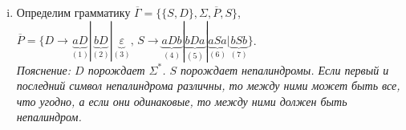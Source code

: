 \documentclass[a4paper]{article}
\begin{document}
{\begin{enumerate}[i.]
\begin{enumerate}
\begin{enumerate}[0.]
\item $n\mod 2=1\Rightarrow w=x\sigma y,\, |x|=|y|,\,\sigma\in\Sigma$. $w=w^R\Rightarrow x\sigma y=y^R\sigma^Rx^R=y^R\sigma x^R$. Так как $|x|=|y|$, $y=x^R\Rightarrow\boxed{w=x\sigma x^R}$
\end{enumerate}
Значит, $L=\{xx^R,\,xax^R,\,xbx^R\big| x\in\Sigma^*\}$.
\\[5pt]
Построим вывод $S\Longrightarrow^*xSx^R$:\begin{enumerate}[a.]
\item Пусть $x=\varepsilon$. $S\overset{(1)}{\Longrightarrow}\varepsilon=\varepsilon\varepsilon^R=w\Rightarrow w\in L(\Gamma)\,\blacksquare$. 
\item Иначе $x=x_1...x_m,\,\forall i\in\overline{1,m}\hookrightarrow x_i\in\Sigma$. Рассмотрим символы $x_m,...,x_1$. Применим правило $(2)$, если $x_i=a$ и $(3)$ иначе. Примененное правило обозначим за $R(i)$ Получим $S\overset{(R(m))}{\Longrightarrow}x_mSx_m\Longrightarrow...\overset{(R(1))}{\Longrightarrow}x_1...x_mSx_m...x_1$.
\end{enumerate}
Теперь покажем, как получить $w$:\begin{enumerate}[1.]
\item $w=xx^R$. Было получено $S\Longrightarrow^*xSx^R$. Тогда $S\Longrightarrow^*xSx^R\overset{(1)}{\Longrightarrow}xx^R\,\blacksquare$
\item $w=xax^R$. Было получено $S\Longrightarrow^*xSx^R$. Тогда $S\Longrightarrow^*xSx^R\overset{(4)}{\Longrightarrow}xax^R\,\blacksquare$
\item $w=xbx^R$. Было получено $S\Longrightarrow^*xSx^R$. Тогда $S\Longrightarrow^*xSx^R\overset{(5)}{\Longrightarrow}xbx^R\,\blacksquare$
\end{enumerate}
Получаем $w\in L(\Gamma)$.\newline
$\boxed{\mbox{Ответ: }\ansbac.}$
\end{enumerate}
\item Определим грамматику $\overline{\Gamma}=\{\{S,D\},\Sigma,\overline{P},S\}$, $\overline{P}=\big\{D\longrightarrow \underbrace{aD}_{(1)}|\underbrace{bD}_{(2)}|\underbrace{\varepsilon}_{(3)},\,S\longrightarrow \underbrace{aDb}_{(4)}|\underbrace{bDa}_{(5)}|\underbrace{aSa}_{(6)}|\underbrace{bSb}_{(7)}\big\}$.
\\[5pt]
{\em Пояснение: $D$ порождает $\Sigma^*$. $S$ порождает непалиндромы. Если первый и последний символ непалиндрома различны, то между ними может быть все, что угодно, а если они одинаковые, то между ними должен быть непалиндром.}
\begin{enumerate}[1.]

\end{enumerate}
\end{enumerate}}
\end{document}

